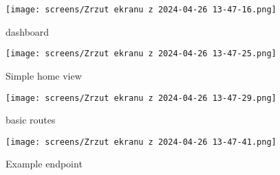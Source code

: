 \documentclass[a4paper]{article}
\begin{document}
\begin{figure}[ht!]
    \centering
    \texttt{[image: screens/Zrzut ekranu z 2024-04-26 13-47-16.png]}
    \caption{dashboard\label{dashboard view}}
\end{figure}

\begin{figure}[ht!]
    \centering
    \texttt{[image: screens/Zrzut ekranu z 2024-04-26 13-47-25.png]}
    \caption{Simple home view\label{simple home view}}
\end{figure}

\begin{figure}[ht!]
    \centering
    \texttt{[image: screens/Zrzut ekranu z 2024-04-26 13-47-29.png]}
    \caption{basic routes\label{all routes}}
\end{figure}

\begin{figure}[ht!]
    \centering
    \texttt{[image: screens/Zrzut ekranu z 2024-04-26 13-47-41.png]}
    \caption{Example endpoint\label{endpoint getuser}}
\end{figure}
\end{document}
